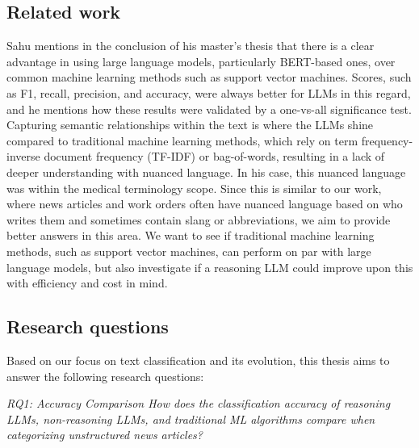 \subsection{Related work}




Sahu \cite{sahu2025language} mentions in the conclusion of his master's thesis that there is a clear advantage in using large language models, particularly BERT-based ones, over common machine learning methods such as support vector machines. Scores, such as F1, recall, precision, and accuracy, were always better for LLMs in this regard, and he mentions how these results were validated by a one-vs-all significance test. Capturing semantic relationships within the text is where the LLMs shine compared to traditional machine learning methods, which rely on term frequency-inverse document frequency (TF-IDF) or bag-of-words, resulting in a lack of deeper understanding with nuanced language. In his case, this nuanced language was within the medical terminology scope. Since this is similar to our work, where news articles and work orders often have nuanced language based on who writes them and sometimes contain slang or abbreviations, we aim to provide better answers in this area. We want to see if traditional machine learning methods, such as support vector machines, can perform on par with large language models, but also investigate if a reasoning LLM could improve upon this with efficiency and cost in mind.



\subsection{Research questions}

Based on our focus on text classification and its evolution, this thesis aims to answer the following research questions:

\bigskip
\textit{RQ1: Accuracy Comparison
\newline
How does the classification accuracy of reasoning LLMs, non-reasoning LLMs, and traditional ML algorithms compare when categorizing unstructured news articles?}

